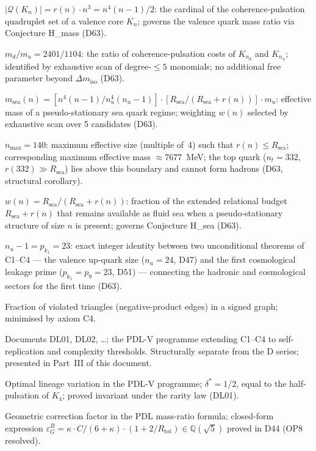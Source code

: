 \documentclass[11pt,a4paper]{article}
\theoremstyle{plain}
\theoremstyle{definition}
\theoremstyle{remark}
\newcommand{\Rtot}{R_{\mathrm{tot}}}
\newcommand{\epsGeomB}{\varepsilon_G^B}
\begin{document}
\begin{description}[leftmargin=3.5cm, style=nextline]
\item[Coherence-pulsation cost] $|\mathcal{Q}(K_n)| = r(n)\cdot n^3 = n^4(n-1)/2$: the cardinal of the coherence-pulsation quadruplet set of a valence core $K_n$; governs the valence quark mass ratio via Conjecture H\_mass (D63).
\item[Conjecture H\_mass] $m_d/m_u = 2401/1104$: the ratio of coherence-pulsation costs of $K_{n_d}$ and $K_{n_u}$; identified by exhaustive scan of degree-$\leq 5$ monomials; no additional free parameter beyond $\Delta m_{\mathrm{iso}}$ (D63).
\item[Conjecture H\_sea] $m_{\mathrm{sea}}(n) = [n^4(n-1)/n_u^4(n_u-1)]\cdot[R_{\mathrm{sea}}/(R_{\mathrm{sea}}+r(n))]\cdot m_u$: effective mass of a pseudo-stationary sea quark regime; weighting $w(n)$ selected by exhaustive scan over 5 candidates (D63).
\item[Hadronisation boundary] $n_{\max} = 140$: maximum effective size (multiple of~4) such that $r(n) \leq R_{\mathrm{sea}}$; corresponding maximum effective mass $\approx 7677$~MeV; the top quark ($n_t = 332$, $r(332) \gg R_{\mathrm{sea}}$) lies above this boundary and cannot form hadrons (D63, structural corollary).
\item[Residual fluidity] $w(n) = R_{\mathrm{sea}}/(R_{\mathrm{sea}}+r(n))$: fraction of the extended relational budget $R_{\mathrm{sea}}+r(n)$ that remains available as fluid sea when a pseudo-stationary structure of size $n$ is present; governs Conjecture H\_sea (D63).
\item[Structural identity] $n_u - 1 = p_{k_1} = 23$: exact integer identity between two unconditional theorems of C1--C4 --- the valence up-quark size ($n_u = 24$, D47) and the first cosmological leakage prime ($p_{k_1} = p_9 = 23$, D51) --- connecting the hadronic and cosmological sectors for the first time (D63).
\item[Coherence cost] Fraction of violated triangles (negative-product edges) in a signed graph; minimised by axiom C4.
\item[DL series] Documents DL01, DL02, \ldots; the PDL-V programme extending C1--C4 to self-replication and complexity thresholds. Structurally separate from the D series; presented in Part~III of this document.
\item[$\delta^*$] Optimal lineage variation in the PDL-V programme; $\delta^* = 1/2$, equal to the half-pulsation of $K_4$; proved invariant under the rarity law (DL01).
\item[$\epsGeomB$] Geometric correction factor in the PDL mass-ratio formula; closed-form expression $\epsGeomB = \kappa \cdot C/(6+\kappa)\cdot(1+2/\Rtot) \in \mathbb{Q}(\sqrt{5})$ proved in D44 (OP8 resolved).

\end{description}
\end{document}
